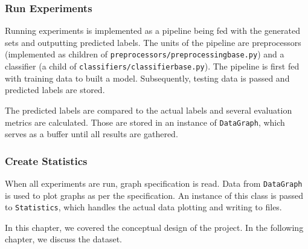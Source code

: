 \subsubsection{Run Experiments}

Running experiments is implemented as a pipeline being fed with the generated sets and outputting predicted labels.
The units of the pipeline are preprocessors (implemented as children of \texttt{preprocessors/preprocessingbase.py}) and a classifier (a child of \texttt{classifiers/classifierbase.py}).
The pipeline is first fed with training data to built a model.
Subsequently, testing data is passed and predicted labels are stored.

The predicted labels are compared to the actual labels and several evaluation metrics are calculated.
Those are stored in an instance of \texttt{DataGraph}, which serves as a buffer until all results are gathered.

\subsubsection{Create Statistics}

When all experiments are run, graph specification is read.
Data from \texttt{DataGraph} is used to plot graphs as per the specification.
An instance of this class is passed to \texttt{Statistics},
which handles the actual data plotting and writing to files.

In this chapter, we covered the conceptual design of the project.
In the following chapter, we discuss the dataset.
